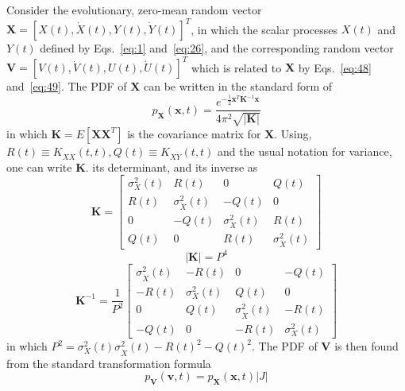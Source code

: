 \documentclass{article}
\begin{document}
Consider the evolutionary, zero-mean random vector $\mathbf{X} = [X (t),
\dot{X} (t), Y (t), \dot{Y} (t)]^T$, in which the scalar processes $X (t)$ and
$Y (t)$ defined by Eqs.~\eqref{eq:1} and~\eqref{eq:26}, and the corresponding
random vector $\mathbf{V} = [V (t), \dot{V} (t), U (t), \dot{U} (t)]^T$ which
is related to $\mathbf{X}$ by Eqs.~\eqref{eq:48} and~\eqref{eq:49}. The PDF of
$\mathbf{X}$ can be written in the standard form of
\begin{equation}
  p_{\mathbf{X}} (\mathbf{x}, t) = \frac{e^{- \frac{1}{2} \mathbf{x}^T
  \mathbf{K}^{- 1} \mathbf{x}}}{4 \pi^2 \sqrt{| \mathbf{K} |}}  \label{eq:A1}
\end{equation}
in which $\mathbf{K} = E [\mathbf{XX}^T]$ is the covariance matrix for
$\mathbf{X}$. Using, $R (t) \equiv K_{X \dot{X}} (t, t), Q (t) \equiv K_{X
\dot{Y}} (t, t)$ and the usual notation for variance, one can write
$\mathbf{K}$. its determinant, and its inverse as
\begin{equation}
  \mathbf{K} = \left[ \begin{array}{cccc}
    \sigma_X^2 (t) & R (t) & 0 & Q (t)\\
    R (t) & \sigma_{\dot{X}}^2 (t) & - Q (t) & 0\\
    0 & - Q (t) & \sigma_X^2 (t) & R (t)\\
    Q (t) & 0 & R (t) & \sigma_{\dot{X}}^2 (t)
  \end{array} \right] \label{eq:A2}
\end{equation}
\begin{equation}
  | \mathbf{K} | = P^4
\end{equation}
\begin{equation}
  \mathbf{K}^{- 1} = \frac{1}{P^2} \left[ \begin{array}{cccc}
    \sigma_{\dot{X}}^2 (t) & - R (t) & 0 & - Q (t)\\
    - R (t) & \sigma_X^2 (t) & Q (t) & 0\\
    0 & Q (t) & \sigma_{\dot{X}}^2 (t) & - R (t)\\
    - Q (t) & 0 & - R (t) & \sigma_X^2 (t)
  \end{array} \right]
\end{equation}
in which $P^2 = \sigma_X^2 (t) \sigma_{\dot{X}}^2 (t) - R (t)^2 - Q (t)^2$.
The PDF of $\mathbf{V}$ is then found from the standard transformation formula
\begin{equation}
  p_{\mathbf{V}} (\mathbf{v}, t) = p_{\mathbf{X}} (\mathbf{x}, t) |J|
  \label{eq:A3}
\end{equation}
\end{document}
